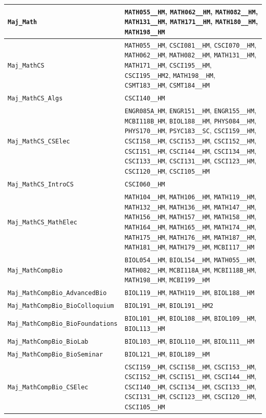 \begin{longtable}{|p{4.4in}|p{4.4in}|}
    \verb|Maj_Math| & \verb|MATH055__HM|, \verb|MATH062__HM|, \verb|MATH082__HM|, \verb|MATH131__HM|, \verb|MATH171__HM|, \verb|MATH180__HM|, \verb|MATH198__HM|\\\hline
    \verb|Maj_MathCS| & \verb|MATH055__HM|, \verb|CSCI081__HM|, \verb|CSCI070__HM|, \verb|MATH062__HM|, \verb|MATH082__HM|, \verb|MATH131__HM|, \verb|MATH171__HM|, \verb|CSCI195__HM|, \verb|CSCI195__HM2|, \verb|MATH198__HM|, \verb|CSMT183__HM|, \verb|CSMT184__HM|\\\hline
    \verb|Maj_MathCS_Algs| & \verb|CSCI140__HM|\\\hline
    \verb|Maj_MathCS_CSElec| & \verb|ENGR085A_HM|, \verb|ENGR151__HM|, \verb|ENGR155__HM|, \verb|MCBI118B_HM|, \verb|BIOL188__HM|, \verb|PHYS084__HM|, \verb|PHYS170__HM|, \verb|PSYC183__SC|, \verb|CSCI159__HM|, \verb|CSCI158__HM|, \verb|CSCI153__HM|, \verb|CSCI152__HM|, \verb|CSCI151__HM|, \verb|CSCI144__HM|, \verb|CSCI134__HM|, \verb|CSCI133__HM|, \verb|CSCI131__HM|, \verb|CSCI123__HM|, \verb|CSCI120__HM|, \verb|CSCI105__HM|\\\hline
    \verb|Maj_MathCS_IntroCS| & \verb|CSCI060__HM|\\\hline
    \verb|Maj_MathCS_MathElec| & \verb|MATH104__HM|, \verb|MATH106__HM|, \verb|MATH119__HM|, \verb|MATH132__HM|, \verb|MATH136__HM|, \verb|MATH147__HM|, \verb|MATH156__HM|, \verb|MATH157__HM|, \verb|MATH158__HM|, \verb|MATH164__HM|, \verb|MATH165__HM|, \verb|MATH174__HM|, \verb|MATH175__HM|, \verb|MATH176__HM|, \verb|MATH187__HM|, \verb|MATH181__HM|, \verb|MATH179__HM|, \verb|MCBI117__HM|\\\hline
    \verb|Maj_MathCompBio| & \verb|BIOL054__HM|, \verb|BIOL154__HM|, \verb|MATH055__HM|, \verb|MATH082__HM|, \verb|MCBI118A_HM|, \verb|MCBI118B_HM|, \verb|MATH198__HM|, \verb|MCBI199__HM|\\\hline
    \verb|Maj_MathCompBio_AdvancedBio| & \verb|BIOL119__HM|, \verb|MATH119__HM|, \verb|BIOL188__HM|\\\hline
    \verb|Maj_MathCompBio_BioColloquium| & \verb|BIOL191__HM|, \verb|BIOL191__HM2|\\\hline
    \verb|Maj_MathCompBio_BioFoundations| & \verb|BIOL101__HM|, \verb|BIOL108__HM|, \verb|BIOL109__HM|, \verb|BIOL113__HM|\\\hline
    \verb|Maj_MathCompBio_BioLab| & \verb|BIOL103__HM|, \verb|BIOL110__HM|, \verb|BIOL111__HM|\\\hline
    \verb|Maj_MathCompBio_BioSeminar| & \verb|BIOL121__HM|, \verb|BIOL189__HM|\\\hline
    \verb|Maj_MathCompBio_CSElec| & \verb|CSCI159__HM|, \verb|CSCI158__HM|, \verb|CSCI153__HM|, \verb|CSCI152__HM|, \verb|CSCI151__HM|, \verb|CSCI144__HM|, \verb|CSCI140__HM|, \verb|CSCI134__HM|, \verb|CSCI133__HM|, \verb|CSCI131__HM|, \verb|CSCI123__HM|, \verb|CSCI120__HM|, \verb|CSCI105__HM|\\\hline

\end{longtable}
